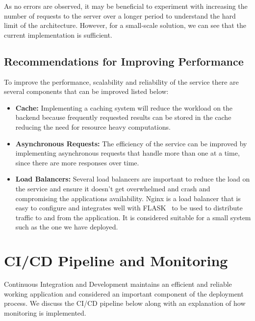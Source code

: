 \documentclass{surreydissertation}
\begin{document}
As no errors are observed, it may be beneficial to experiment with increasing the number of requests to the server over a longer period to understand the hard limit of the architecture. However, for a small-scale solution, we can see that the current implementation is sufficient.

\subsection{Recommendations for Improving Performance}
To improve the performance, scalability and reliability of the service there are several components that can be improved listed below:

\begin{itemize}
    \item \textbf{Cache:} Implementing a caching system will reduce the workload on the backend because frequently requested results can be stored in the cache reducing the need for resource heavy computations. 
    \item \textbf{Asynchronous Requests:} The efficiency of the service can be improved by implementing asynchronous requests that handle more than one at a time, since there are more responses over time.
    \item \textbf{Load Balancers:} Several load balancers are important to reduce the load on the service and ensure it doesn't get overwhelmed and crash and compromising the applications availability. Nginx is a load balancer that is easy to configure and integrates well with FLASK~\cite{flask} to be used to distribute traffic to and from the application. It is considered suitable for a small system such as the one we have deployed.
\end{itemize}


\section{CI/CD Pipeline and Monitoring}
Continuous Integration and Development maintains an efficient and reliable working application and considered an important component of the deployment process. We discuss the CI/CD pipeline below along with an explanation of how monitoring is implemented.
\end{document}
